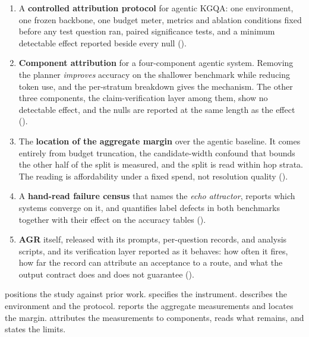 \begin{enumerate}
  \item A \textbf{controlled attribution protocol} for agentic KGQA: one
    environment, one frozen backbone, one budget meter, metrics and
    ablation conditions fixed before any test question ran, paired
    significance tests, and a minimum detectable effect reported beside
    every null ().
  \item \textbf{Component attribution} for a four-component agentic
    system. Removing the planner \emph{improves} accuracy on the
    shallower benchmark while reducing token use, and the per-stratum
    breakdown gives the mechanism. The other three components, the
    claim-verification layer among them, show no detectable effect, and
    the nulls are reported at the same length as the effect
    ().
  \item The \textbf{location of the aggregate margin} over the agentic
    baseline. It comes entirely from budget truncation, the
    candidate-width confound that bounds the other half of the split is
    measured, and the split is read within hop strata. The reading is
    affordability under a fixed spend, not resolution quality
    ().
  \item A \textbf{hand-read failure census} that names the \emph{echo
    attractor}, reports which systems converge on it, and quantifies
    label defects in both benchmarks together with their effect on the
    accuracy tables ().
  \item \textbf{AGR} itself, released with its prompts, per-question
    records, and analysis scripts, and its verification layer reported
    as it behaves: how often it fires, how far the record can attribute
    an acceptance to a route, and what the output contract does and does
    not guarantee ().
\end{enumerate}

 positions the study against prior work.
 specifies the instrument. 
describes the environment and the protocol.  reports
the aggregate measurements and locates the margin.
 attributes the measurements to components,
 reads what remains, and 
states the limits.
